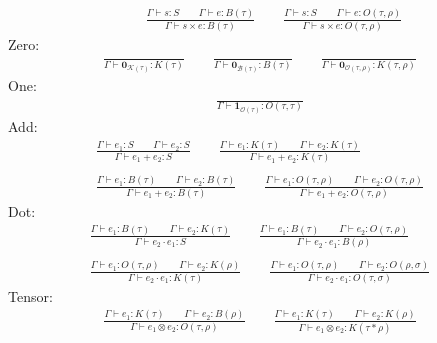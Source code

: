 \documentclass[manuscript, review, timestamp]{acmart}
\begin{document}
\begin{definition}
\begin{gather*}
    \qquad
    \frac{\Gamma \vdash s : S \qquad \Gamma \vdash e : B(\tau)}{\Gamma \vdash s \times e : B(\tau)} 
    \qquad
    \frac{\Gamma \vdash s : S \qquad \Gamma \vdash e : O(\tau, \rho)}{\Gamma \vdash s \times e : O(\tau, \rho)}
  \end{gather*}
  Zero:
  \begin{gather*}
    \frac{}{\Gamma \vdash \mathbf{0}_{\mathcal{K}(\tau)} : K(\tau)}
    \qquad
    \frac{}{\Gamma \vdash \mathbf{0}_{\mathcal{B}(\tau)} : B(\tau)}
    \qquad
    \frac{}{\Gamma \vdash \mathbf{0}_{\mathcal{O}(\tau, \rho)} : K(\tau, \rho)}
  \end{gather*}
  One:
  \begin{gather*}
    \frac{}{\Gamma \vdash \mathbf{1}_{\mathcal{O}(\tau)} : O(\tau, \tau)}
  \end{gather*}
  Add:
  \begin{gather*}
    \frac{\Gamma \vdash e_1 : S \qquad \Gamma \vdash e_2 : S }{\Gamma \vdash e_1 + e_2 : S }
    \qquad
    \frac{\Gamma \vdash e_1 : K(\tau) \qquad \Gamma \vdash e_2 : K(\tau) }{\Gamma \vdash e_1 + e_2 : K(\tau) } \\
    \\
    \frac{\Gamma \vdash e_1 : B(\tau) \qquad \Gamma \vdash e_2 : B(\tau) }{\Gamma \vdash e_1 + e_2 : B(\tau) }
    \qquad
    \frac{\Gamma \vdash e_1 : O(\tau, \rho) \qquad \Gamma \vdash e_2 : O(\tau, \rho) }{\Gamma \vdash e_1 + e_2 : O(\tau, \rho) }
  \end{gather*}
  Dot:
  \begin{gather*}
    \frac{\Gamma \vdash e_1 : B(\tau) \qquad \Gamma \vdash e_2 : K(\tau) }{\Gamma \vdash e_2 \cdot e_1 : S } 
    \qquad 
    \frac{\Gamma \vdash e_1 : B(\tau) \qquad \Gamma \vdash e_2 : O(\tau, \rho) }{\Gamma \vdash e_2 \cdot e_1 : B(\rho) } \\
    \\
    \frac{\Gamma \vdash e_1 : O(\tau, \rho) \qquad \Gamma \vdash e_2 : K(\rho) }{\Gamma \vdash e_2 \cdot e_1 : K(\tau) }
    \qquad
    \frac{\Gamma \vdash e_1 : O(\tau, \rho) \qquad \Gamma \vdash e_2 : O(\rho, \sigma) }{\Gamma \vdash e_2 \cdot e_1 : O(\tau, \sigma) }
  \end{gather*}
  Tensor:
  \begin{gather*}
    \frac{\Gamma \vdash e_1 : K(\tau) \qquad \Gamma \vdash e_2 : B(\rho) }{\Gamma \vdash e_1 \otimes e_2 : O(\tau, \rho)}
    \qquad
    \frac{\Gamma \vdash e_1 : K(\tau) \qquad \Gamma \vdash e_2 : K(\rho) }{\Gamma \vdash e_1 \otimes e_2 : K(\tau * \rho)} \\

\end{gather*}
\end{definition}
\end{document}
